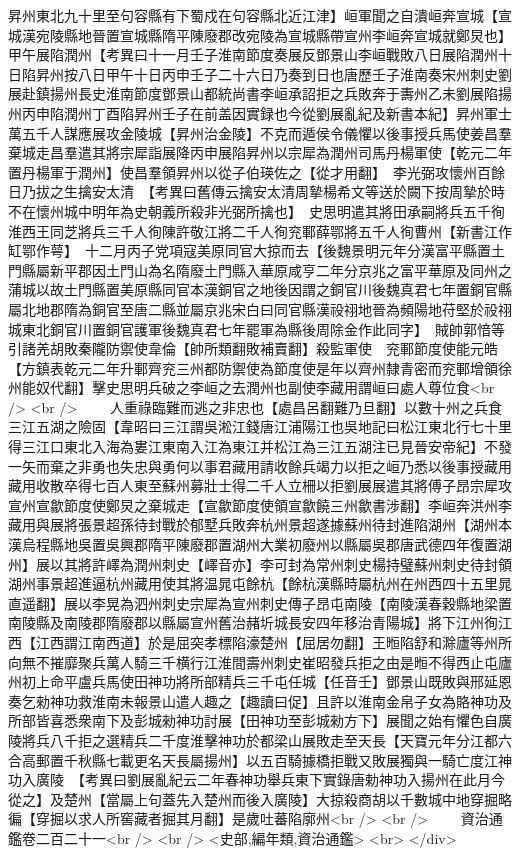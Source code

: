 昇州東北九十里至句容縣有下蜀戍在句容縣北近江津】峘軍聞之自潰峘奔宣城【宣城漢宛陵縣地晉置宣城縣隋平陳廢郡改宛陵為宣城縣帶宣州李峘奔宣城就鄭炅也】甲午展陷潤州【考異曰十一月壬子淮南節度奏展反鄧景山李峘戰敗八日展陷潤州十日陷昇州按八日甲午十日丙申壬子二十六日乃奏到日也唐歷壬子淮南奏宋州刺史劉展赴鎮揚州長史淮南節度鄧景山都統尚書李峘承詔拒之兵敗奔于夀州乙未劉展陷揚州丙申陷潤州丁酉陷昇州壬子在前盖因實録也今從劉展亂紀及新書本紀】昇州軍士萬五千人謀應展攻金陵城【昇州治金陵】不克而遁侯令儀懼以後事授兵馬使姜昌羣棄城走昌羣遣其將宗犀詣展降丙申展陷昇州以宗犀為潤州司馬丹楊軍使【乾元二年置丹楊軍于潤州】使昌羣領昇州以從子伯瑛佐之【從才用翻】　李光弼攻懷州百餘日乃拔之生擒安太清　【考異曰舊傳云擒安太清周摯楊希文等送於闕下按周摯於時不在懷州城中明年為史朝義所殺非光弼所擒也】　史思明遣其將田承嗣將兵五千徇淮西王同芝將兵三千人徇陳許敬江將二千人徇兖鄆薛鄂將五千人徇曹州【新書江作缸鄂作萼】　十二月丙子党項寇美原同官大掠而去【後魏景明元年分漢富平縣置土門縣屬新平郡因土門山為名隋廢土門縣入華原咸亨二年分京兆之富平華原及同州之蒲城以故土門縣置美原縣同官本漢銅官之地後因謂之銅官川後魏真君七年置銅官縣屬北地郡隋為銅官至唐二縣並屬京兆宋白曰同官縣漢祋祤地晉為頻陽地苻堅於祋祤城東北銅官川置銅官護軍後魏真君七年罷軍為縣後周除金作此同字】　賊帥郭愔等引諸羌胡敗秦隴防禦使韋倫【帥所類翻敗補賣翻】殺監軍使　兖鄆節度使能元皓【方鎮表乾元二年升鄆齊兖三州都防禦使為節度使是年以齊州隸青密而兖鄆增領徐州能奴代翻】擊史思明兵破之李峘之去潤州也副使李藏用謂峘曰處人尊位食<br />
<br />
　　人重祿臨難而逃之非忠也【處昌呂翻難乃旦翻】以數十州之兵食三江五湖之險固【韋昭曰三江謂吳淞江錢唐江浦陽江也吳地記曰松江東北行七十里得三江口東北入海為婁江東南入江為東江并松江為三江五湖注已見晉安帝紀】不發一矢而棄之非勇也失忠與勇何以事君藏用請收餘兵竭力以拒之峘乃悉以後事授藏用藏用收散卒得七百人東至蘇州募壯士得二千人立柵以拒劉展展遣其將傅子昂宗犀攻宣州宣歙節度使鄭炅之棄城走【宣歙節度使領宣歙饒三州歙書涉翻】李峘奔洪州李藏用與展將張景超孫待封戰於郁墅兵敗奔杭州景超遂據蘇州待封進陷湖州【湖州本漢烏程縣地吳置吳興郡隋平陳廢郡置湖州大業初廢州以縣屬吳郡唐武德四年復置湖州】展以其將許嶧為潤州刺史【嶧音亦】李可封為常州刺史楊持璧蘇州刺史待封領湖州事景超進逼杭州藏用使其將温晁屯餘杭【餘杭漢縣時屬杭州在州西四十五里晁直遥翻】展以李晃為泗州刺史宗犀為宣州刺史傳子昂屯南陵【南陵漢春穀縣地梁置南陵縣及南陵郡隋廢郡以縣屬宣州舊治赭圻城長安四年移治青陽城】將下江州徇江西【江西謂江南西道】於是屈突孝標陷濠楚州【屈居勿翻】王暅陷舒和滁廬等州所向無不摧靡聚兵萬人騎三千横行江淮間壽州刺史崔昭發兵拒之由是暅不得西止屯廬州初上命平盧兵馬使田神功將所部精兵三千屯任城【任音壬】鄧景山既敗與邢延恩奏乞勑神功救淮南未報景山遣人趣之【趣讀曰促】且許以淮南金帛子女為賂神功及所部皆喜悉衆南下及彭城勑神功討展【田神功至彭城勑方下】展聞之始有懼色自廣陵將兵八千拒之選精兵二千度淮擊神功於都梁山展敗走至天長【天寶元年分江都六合高郵置千秋縣七載更名天長屬揚州】以五百騎據橋拒戰又敗展獨與一騎亡度江神功入廣陵　【考異曰劉展亂紀云二年春神功舉兵東下實錄唐勅神功入揚州在此月今從之】及楚州【當屬上句蓋先入楚州而後入廣陵】大掠殺商胡以千數城中地穿掘略徧【穿掘以求人所窖藏者掘其月翻】是歲吐蕃陷廓州<br />
<br />
　　資治通鑑卷二百二十一<br />
<br />
<史部,編年類,資治通鑑>  <br>
   </div> 

